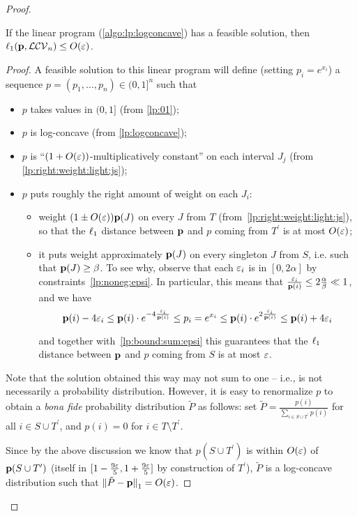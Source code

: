\begin{proof}
\begin{lemma}[Soundness]\label{lemma:lp:logconcave:soundness}
If the linear program (\cref{algo:lp:logconcave}) has a feasible solution, then $\lp[1](\D, \classlogconcave)\leq \bigO{\eps}$.
\end{lemma}
\begin{proof}
\noindent A feasible solution to this linear program will define (setting $p_i=e^{x_i}$) a sequence $p=(p_1,\dots,p_n) \in (0,1]^n$ such that
\begin{itemize}
  \item $p$ takes values in $(0,1]$ (from \eqref{lp:01});
  \item $p$ is log-concave (from \eqref{lp:logconcave});
  \item $p$ is ``$(1+O(\eps))$-multiplicatively constant'' on each interval $J_j$ (from \eqref{lp:right:weight:light:js});
  \item $p$ puts roughly the right amount of weight on each $J_i$:
    \begin{itemize}
      \item weight $(1\pm O(\eps))\D(J)$ on every $J$ from $T$ (from~\eqref{lp:right:weight:light:js}), so that the $\lp[1]$ distance between $\D$ and $p$ coming from $T^\prime$ is at most $O(\eps)$;
      \item it puts weight approximately $\D(J)$ on every singleton $J$ from $S$, i.e. such that $\D(J) \geq \beta$. To see why, observe that each $\eps_i$ is in $[0,2\alpha]$ by constraints~\eqref{lp:noneg:epsi}. In particular, this means that $\frac{\eps_i}{\D(i)} \leq 2\frac{\alpha}{\beta} \ll 1$, and 
      we have
      \[
           \D(i) - 4\eps_i \leq \D(i)\cdot e^{-4\frac{\eps_i}{\D(i)}} \leq p_i = e^{x_i} \leq \D(i)\cdot e^{2\frac{\eps_i}{\D(i)}} \leq \D(i)+4\eps_i
      \]
      
       and together with~\eqref{lp:bound:sum:epsi} this guarantees that the $\lp[1]$ distance between $\D$ and $p$ coming from $S$ is at most $\eps$.
    \end{itemize}
\end{itemize}
Note that the solution obtained this way may not sum to one -- i.e., is not necessarily a probability distribution. However, it is easy to renormalize $p$ to obtain a \emph{bona fide} probability distribution $\tilde{P}$ as follows: set $\tilde{P} = \frac{p(i)}{\sum_{i\in S\cup T^\prime} p(i)}$ for all $i\in S\cup T^\prime$, and $p(i) =0$ for $i\in T\setminus T^\prime$.

Since by the above discussion we know that $p(S\cup T^\prime)$ is within $\bigO{\eps}$ of $\D(S\cup T^\prime)$ (itself in $[1-\frac{9\eps}{5}, 1+\frac{9\eps}{5}]$ by construction of $T^\prime$), $\tilde{P}$ is a log-concave distribution such that $\normone{\tilde{P}-\D} = \bigO{\eps}$.
\end{proof}


\end{proof}
